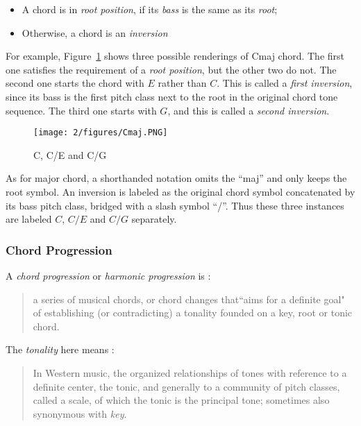 \begin{itemize}
\item A chord is in {\it root position}, if its {\it bass} is the same as its {\it root};
\item Otherwise, a chord is an {\it inversion}
\end{itemize}
For example, Figure~\ref{fig:2-cmaj} shows three possible renderings of Cmaj chord. The first one satisfies the requirement of a {\it root position}, but the other two do not. The second one starts the chord with $E$ rather than $C$. This is called a {\it first inversion}, since its bass is the first pitch class next to the root in the original chord tone sequence. The third one starts with $G$, and this is called a {\it second inversion}.

\begin{figure}[htb]
\centering
\texttt{[image: 2/figures/Cmaj.PNG]}
\caption{C, C/E and C/G}
\label{fig:2-cmaj}
\end{figure}

As for major chord, a shorthanded notation omits the ``maj'' and only keeps the root symbol. An inversion is labeled as the original chord symbol concatenated by its bass pitch class, bridged with a slash symbol ``/''. Thus these three instances are labeled $C$, $C/E$ and $C/G$ separately.

\subsubsection{Chord Progression}
A {\it chord progression} or {\it harmonic progression} is \cite{schonberg1989structural}:
\begin{quote}
a series of musical chords, or chord changes that``aims for a definite goal" of establishing (or contradicting) a tonality founded on a key, root or tonic chord.
\end{quote}
The {\it tonality} here means \cite{randel1999harvard}:
\begin{quote}
In Western music, the organized relationships of tones with reference to a definite center, the tonic, and generally to a community of pitch classes, called a scale, of which the tonic is the principal tone; sometimes also synonymous with {\it key}.
\end{quote}

